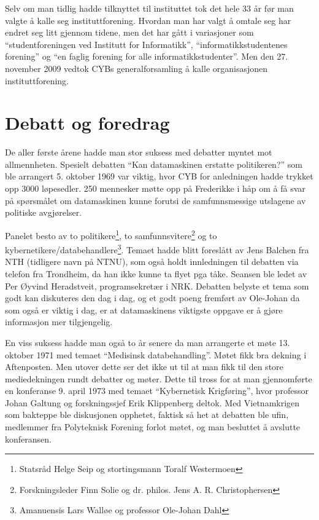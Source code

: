 Selv om man tidlig hadde tilknyttet til instituttet tok det hele 33 år før man valgte å kalle seg instituttforening. Hvordan man har valgt å omtale seg har endret seg litt gjennom tidene, men det har gått i variasjoner som ``studentforeningen ved Institutt for Informatikk'', ``informatikkstudentenes forening'' og ``en faglig forening for alle informatikkstudenter''. Men den 27. november 2009 vedtok CYBs generalforsamling å kalle organisasjonen instituttforening.

\section{Debatt og foredrag}

De aller første årene hadde man stor suksess med debatter myntet mot allmennheten. Spesielt debatten ``Kan datamaskinen erstatte politikeren?'' som ble arrangert 5. oktober 1969 var viktig, hvor CYB for anledningen hadde trykket opp 3000 løpesedler. 250 mennesker møtte opp på Frederikke i håp om å få svar på spørsmålet om datamaskinen kunne forutsi de samfunnsmessige utslagene av politiske avgjørelser. 

Panelet besto av to politikere\footnote{Statsråd Helge Seip og stortingsmann Toralf Westermoen}, to samfunnsvitere\footnote{Forskningsleder Finn Solie og dr. philos. Jens A. R. Christophersen} og to kybernetikere\slash databehandlere\footnote{Amanuensis Lars Walløe og professor Ole-Johan Dahl}. Temaet hadde blitt foreslått av Jens Balchen fra NTH (tidligere navn på NTNU), som også holdt innledningen til debatten via telefon fra Trondheim, da han ikke kunne ta flyet pga tåke. Seansen ble ledet av Per Øyvind Heradstveit, programsekretær i NRK. Debatten belyste et tema som godt kan diskuteres den dag i dag, og et godt poeng fremført av Ole-Johan da som også er viktig i dag, er at datamaskinens viktigste oppgave er å gjøre informasjon mer tilgjengelig.

En viss suksess hadde man også to år senere da man arrangerte et møte 13. oktober 1971 med temaet ``Medisinsk databehandling''. Møtet fikk bra dekning i Aftenposten. Men utover dette ser det ikke ut til at man fikk til den store mediedekningen rundt debatter og møter. Dette til tross for at man gjennomførte en konferanse 9. april 1973 med temaet ``Kybernetisk Krigføring'', hvor professor Johan Galtung og forskningssjef Erik Klippenberg deltok. Med Vietnamkrigen som bakteppe ble diskusjonen opphetet, faktisk så het at debatten ble ufin, medlemmer fra Polyteknisk Forening forlot møtet, og man besluttet å avslutte konferansen.


